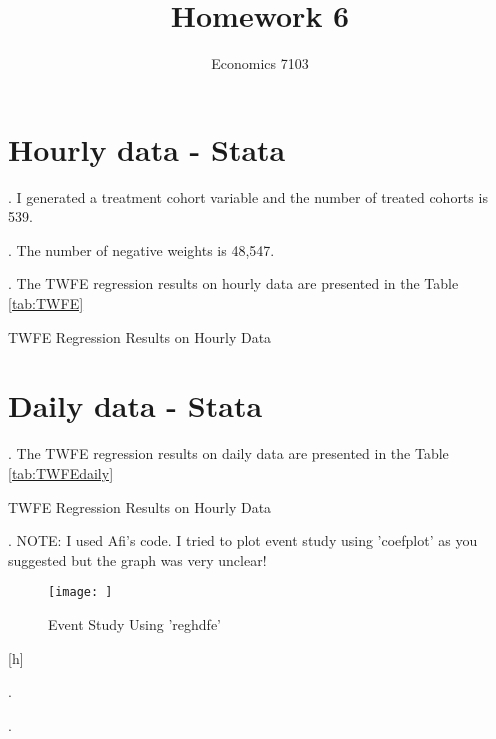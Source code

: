 \documentclass{article}
\title{Homework 6}
\author{Economics 7103}
\begin{document}
  
\maketitle

\section{Hourly data - Stata}
. I generated a treatment cohort variable and the number of treated cohorts is 539.

. The number of negative weights is  48,547.

. The TWFE regression results on hourly data are presented in the Table \ref{tab:TWFE}

\begin{table}[h]
    \centering
    
    \caption{TWFE Regression Results on Hourly Data}
    \label{tab:TWFE}
\end{table}

\clearpage

\section{Daily data - Stata}

. The TWFE regression results on daily data are presented in the Table \ref{tab:TWFEdaily}

\begin{table}[h]
    \centering
    
    \caption{TWFE Regression Results on Hourly Data}
    \label{tab:TWFEdaily}
\end{table}

. NOTE: I used Afi's code. I tried to plot event study using 'coefplot' as you suggested but the graph was very unclear!

\begin{figure}
    \centering
    \texttt{[image: ]}
    \caption{Event Study  Using 'reghdfe'}
    \label{fig:eventstudy1}
\end{figure}[h]

. 

.
\end{document}
